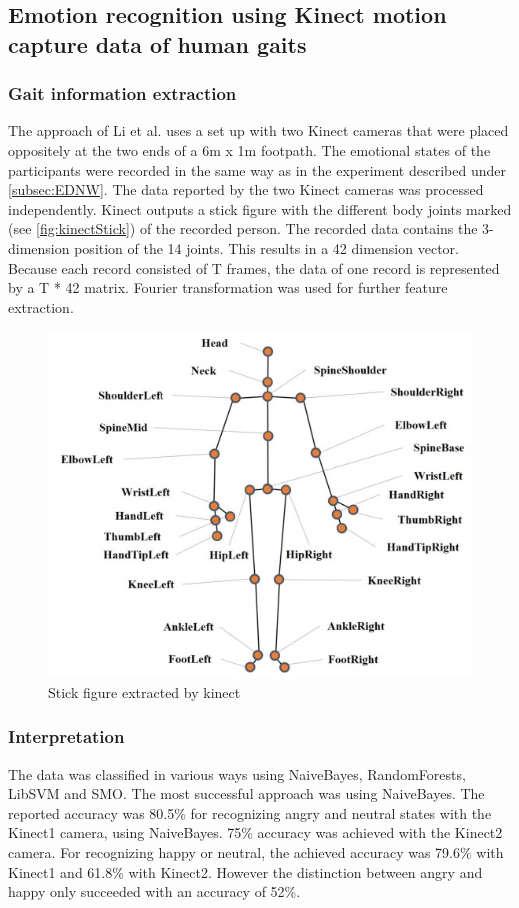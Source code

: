\documentclass[conference]{IEEEtran}
\begin{document}
\subsection{Emotion recognition using Kinect motion capture data of human gaits}
\label{subsec:LiGait}
\subsubsection{Gait information extraction}
The approach of Li et al.\cite{li2016emotion} uses a set up with two Kinect cameras that were placed oppositely at the two ends of a 6m x 1m footpath. The emotional states of the participants were recorded in the same way as in the experiment described under \autoref{subsec:EDNW}. The data reported by the two Kinect cameras was processed independently. Kinect outputs a stick figure with the different body joints marked (see \autoref{fig:kinectStick}) of the recorded person. The recorded data contains the 3-dimension position of the 14 joints. This results in a 42 dimension vector. Because each record consisted of T frames, the data of one record is represented by a T * 42 matrix. Fourier transformation was used for further feature extraction. 

\begin{figure}[H]
\centering
\includegraphics[width=\linewidth]{kinectStick.jpg}
\caption{Stick figure extracted by kinect\cite{li2016emotion}}
\label{fig:kinectStick}
\end{figure}

\subsubsection{Interpretation}
The data was classified in various ways using NaiveBayes, RandomForests, LibSVM and SMO\cite{li2016emotion}. The most successful approach was using NaiveBayes.  
The reported accuracy was 80.5\% for recognizing angry and neutral states with the Kinect1 camera, using NaiveBayes. 75\% accuracy was achieved with the Kinect2 camera.
For recognizing happy or neutral, the achieved accuracy was 79.6\% with Kinect1 and 61.8\% with Kinect2. However the distinction between angry and happy only succeeded with an accuracy of 52\%.
\end{document}
